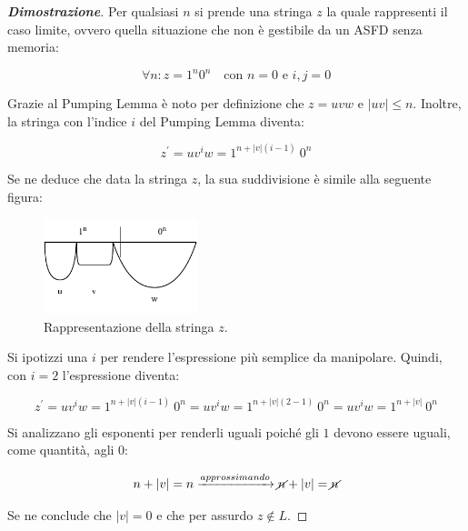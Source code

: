\documentclass[a4paper]{article}
\begin{document}
	\begin{proof}[\textcolor{Blue3}{\textbf{Dimostrazione}}]
		Per qualsiasi $n$ si prende una stringa $z$ la quale rappresenti il caso limite, ovvero quella situazione che non è gestibile da un ASFD senza memoria:
		
		\begin{equation*}
			\forall n : z = 1^{n} 0^{n} \hspace{1em} \text{con } n = 0 \text{ e } i,j = 0	
		\end{equation*}
	
		\noindent
		Grazie al Pumping Lemma è noto per definizione che $z = uvw$ e $|uv| \le n$. Inoltre, la stringa con l'indice $i$ del Pumping Lemma diventa:
		
		\begin{equation*}
			z^{'} = u v^{i} w = 1^{n + |v|\left(i - 1\right)} \: 0^{n}
		\end{equation*}
		
		\noindent
		Se ne deduce che data la stringa $z$, la sua suddivisione è simile alla seguente figura:
		
		\begin{figure}[!htp]
			\centering
			\includegraphics[width=0.4\textwidth]{img/lemma_pumping_ex1.pdf}
			\caption{Rappresentazione della stringa $z$.}
		\end{figure}
		
		\noindent
		Si ipotizzi una $i$ per rendere l'espressione più semplice da manipolare. Quindi, con $i = 2$ l'espressione diventa:
		
		\begin{equation*}
			z^{'} = u v^{i} w = 1^{n + |v|\left(i - 1\right)} \: 0^{n} = u v^{i} w = 1^{n + |v|\left(2 - 1\right)} \: 0^{n} = u v^{i} w = 1^{n + |v|} \: 0^{n}
		\end{equation*}
	
		\noindent
		Si analizzano gli esponenti per renderli uguali poiché gli $1$ devono essere uguali, come quantità, agli $0$:
		
		\begin{equation*}
			n + |v| = n \xrightarrow{approssimando} \cancel{n} + |v| = \cancel{n}
		\end{equation*}
	
		\noindent
		Se ne conclude che $|v| = 0$ e che per assurdo $z \notin L$.
	\end{proof}
\end{document}
